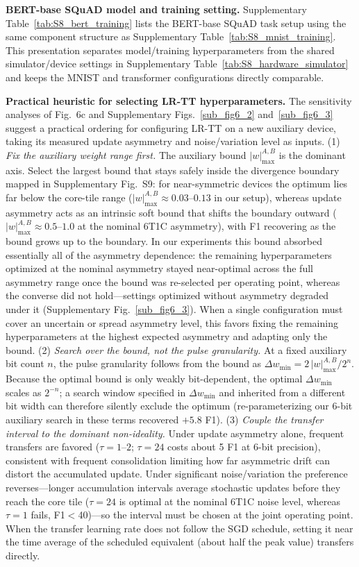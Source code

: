 \documentclass[fleqn,10pt]{wlscirep}
\begin{document}
\noindent\textbf{BERT-base SQuAD model and training setting.}
Supplementary Table~\ref{tab:S8_bert_training} lists the BERT-base SQuAD task setup using the same component structure as Supplementary Table~\ref{tab:S8_mnist_training}. This presentation separates model/training hyperparameters from the shared simulator/device settings in Supplementary Table~\ref{tab:S8_hardware_simulator} and keeps the MNIST and transformer configurations directly comparable.

\clearpage
\noindent\textbf{Practical heuristic for selecting LR-TT hyperparameters.}
The sensitivity analyses of Fig.~6c and Supplementary Figs.~\ref{sub_fig6_2} and~\ref{sub_fig6_3} suggest a practical ordering for configuring LR-TT on a new auxiliary device, taking its measured update asymmetry and noise/variation level as inputs.
(1) \emph{Fix the auxiliary weight range first.} The auxiliary bound \(|w|_{\max}^{A,B}\) is the dominant axis. Select the largest bound that stays safely inside the divergence boundary mapped in Supplementary Fig.~S9: for near-symmetric devices the optimum lies far below the core-tile range (\(|w|_{\max}^{A,B}\approx0.03\)--\(0.13\) in our setup), whereas update asymmetry acts as an intrinsic soft bound that shifts the boundary outward (\(|w|_{\max}^{A,B}\approx0.5\)--\(1.0\) at the nominal 6T1C asymmetry), with F1 recovering as the bound grows up to the boundary. In our experiments this bound absorbed essentially all of the asymmetry dependence: the remaining hyperparameters optimized at the nominal asymmetry stayed near-optimal across the full asymmetry range once the bound was re-selected per operating point, whereas the converse did not hold---settings optimized without asymmetry degraded under it (Supplementary Fig.~\ref{sub_fig6_3}). When a single configuration must cover an uncertain or spread asymmetry level, this favors fixing the remaining hyperparameters at the highest expected asymmetry and adapting only the bound.
(2) \emph{Search over the bound, not the pulse granularity.} At a fixed auxiliary bit count \(n\), the pulse granularity follows from the bound as \(\Delta w_{\min} = 2\,|w|_{\max}^{A,B}/2^{n}\). Because the optimal bound is only weakly bit-dependent, the optimal \(\Delta w_{\min}\) scales as \(2^{-n}\); a search window specified in \(\Delta w_{\min}\) and inherited from a different bit width can therefore silently exclude the optimum (re-parameterizing our 6-bit auxiliary search in these terms recovered \(+5.8\) F1).
(3) \emph{Couple the transfer interval to the dominant non-ideality.} Under update asymmetry alone, frequent transfers are favored (\(\tau=1\)--\(2\); \(\tau=24\) costs about 5 F1 at 6-bit precision), consistent with frequent consolidation limiting how far asymmetric drift can distort the accumulated update. Under significant noise/variation the preference reverses---longer accumulation intervals average stochastic updates before they reach the core tile (\(\tau=24\) is optimal at the nominal 6T1C noise level, whereas \(\tau=1\) fails, F1\(<\)40)---so the interval must be chosen at the joint operating point. When the transfer learning rate does not follow the SGD schedule, setting it near the time average of the scheduled equivalent (about half the peak value) transfers directly.
\end{document}
